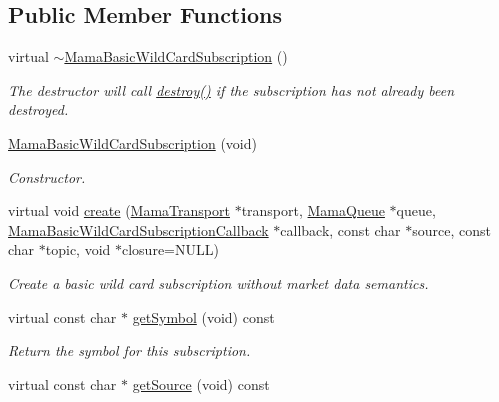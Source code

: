 \subsection*{Public Member Functions}
\begin{DoxyCompactItemize}
\item 
virtual \hyperlink{classWombat_1_1MamaBasicWildCardSubscription_a95396711c2631fa095cce444676c686c}{$\sim$MamaBasicWildCardSubscription} ()
\begin{DoxyCompactList}\small\item\em The destructor will call {\ttfamily \hyperlink{classWombat_1_1MamaBasicSubscription_a296c25c10faa885e408e064a626ce3dd}{destroy()}} if the subscription has not already been destroyed. \item\end{DoxyCompactList}\item 
\hyperlink{classWombat_1_1MamaBasicWildCardSubscription_a617b4191e0b7b9db769525a602249062}{MamaBasicWildCardSubscription} (void)
\begin{DoxyCompactList}\small\item\em Constructor. \item\end{DoxyCompactList}\item 
virtual void \hyperlink{classWombat_1_1MamaBasicWildCardSubscription_a47b0951423f36f41995e152a07f688fc}{create} (\hyperlink{classWombat_1_1MamaTransport}{MamaTransport} $\ast$transport, \hyperlink{classWombat_1_1MamaQueue}{MamaQueue} $\ast$queue, \hyperlink{classWombat_1_1MamaBasicWildCardSubscriptionCallback}{MamaBasicWildCardSubscriptionCallback} $\ast$callback, const char $\ast$source, const char $\ast$topic, void $\ast$closure=NULL)
\begin{DoxyCompactList}\small\item\em Create a basic wild card subscription without market data semantics. \item\end{DoxyCompactList}\item 
virtual const char $\ast$ \hyperlink{classWombat_1_1MamaBasicWildCardSubscription_ae679ef667a9a823214f6bb972035c501}{getSymbol} (void) const 
\begin{DoxyCompactList}\small\item\em Return the symbol for this subscription. \item\end{DoxyCompactList}\item 
virtual const char $\ast$ \hyperlink{classWombat_1_1MamaBasicWildCardSubscription_a8e9611d5a76d36c1c67c2158f89273e8}{getSource} (void) const 

\end{DoxyCompactItemize}
